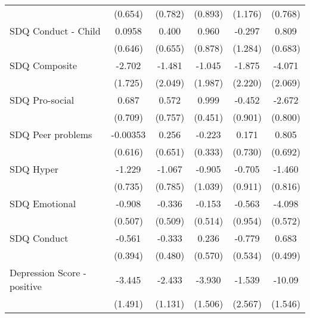 {\begin{tabular}{l*{5}{c}}
            &     (0.654)         &     (0.782)         &     (0.893)         &     (1.176)         &     (0.768)         \\
\addlinespace
SDQ Conduct - Child&      0.0958         &       0.400         &       0.960         &      -0.297         &       0.809         \\
            &     (0.646)         &     (0.655)         &     (0.878)         &     (1.284)         &     (0.683)         \\
\addlinespace
SDQ Composite&      -2.702         &      -1.481         &      -1.045         &      -1.875         &      -4.071\sym{*}  \\
            &     (1.725)         &     (2.049)         &     (1.987)         &     (2.220)         &     (2.069)         \\
\addlinespace
SDQ Pro-social&       0.687         &       0.572         &       0.999\sym{*}  &      -0.452         &      -2.672\sym{***}\\
            &     (0.709)         &     (0.757)         &     (0.451)         &     (0.901)         &     (0.800)         \\
\addlinespace
SDQ Peer problems&    -0.00353         &       0.256         &      -0.223         &       0.171         &       0.805         \\
            &     (0.616)         &     (0.651)         &     (0.333)         &     (0.730)         &     (0.692)         \\
\addlinespace
SDQ Hyper   &      -1.229         &      -1.067         &      -0.905         &      -0.705         &      -1.460         \\
            &     (0.735)         &     (0.785)         &     (1.039)         &     (0.911)         &     (0.816)         \\
\addlinespace
SDQ Emotional&      -0.908         &      -0.336         &      -0.153         &      -0.563         &      -4.098\sym{***}\\
            &     (0.507)         &     (0.509)         &     (0.514)         &     (0.954)         &     (0.572)         \\
\addlinespace
SDQ Conduct &      -0.561         &      -0.333         &       0.236         &      -0.779         &       0.683         \\
            &     (0.394)         &     (0.480)         &     (0.570)         &     (0.534)         &     (0.499)         \\
\addlinespace
Depression Score - positive&      -3.445\sym{*}  &      -2.433\sym{*}  &      -3.930\sym{**} &      -1.539         &      -10.09\sym{***}\\
            &     (1.491)         &     (1.131)         &     (1.506)         &     (2.567)         &     (1.546)         \\
\bottomrule
\end{tabular}
}
